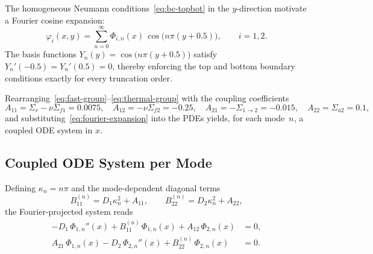 The homogeneous Neumann conditions~\eqref{eq:bc-topbot} in the $y$-direction motivate a Fourier cosine expansion:
\begin{equation}
  \varphi_i(x,y) = \sum_{n=0}^{\infty} \Phi_{i,n}(x)\,
  \cos\!\bigl(n\pi(y+0.5)\bigr),
  \qquad i=1,2.
  \label{eq:fourier-expansion}
\end{equation}
The basis functions $Y_n(y) = \cos\bigl(n\pi(y{+}0.5)\bigr)$ satisfy $Y_n'(-0.5) = Y_n'(0.5) = 0$, thereby enforcing the top and bottom boundary conditions exactly for every truncation order.

Rearranging~\eqref{eq:fast-group}--\eqref{eq:thermal-group} with the coupling coefficients
\begin{equation}
  A_{11} = \Sigma_r - \nu\Sigma_{f1} = 0.0075,\quad
  A_{12} = -\nu\Sigma_{f2} = -0.25,\quad
  A_{21} = -\Sigma_{1\to 2} = -0.015,\quad
  A_{22} = \Sigma_{a2} = 0.1,
  \label{eq:coupling-coeffs}
\end{equation}
and substituting~\eqref{eq:fourier-expansion} into the PDEs yields, for each mode~$n$, a coupled ODE system in $x$.

\subsection{Coupled ODE System per Mode}
\label{sec:coupled-ode}

Defining $\kappa_n = n\pi$ and the mode-dependent diagonal terms
\begin{equation}
  B_{11}^{(n)} = D_1\kappa_n^2 + A_{11},\qquad
  B_{22}^{(n)} = D_2\kappa_n^2 + A_{22},
  \label{eq:B-coeffs}
\end{equation}
the Fourier-projected system reads
\begin{align}
  -D_1\,\Phi_{1,n}''(x) + B_{11}^{(n)}\,\Phi_{1,n}(x) + A_{12}\,\Phi_{2,n}(x) &= 0,
  \label{eq:ode-fast} \\
  A_{21}\,\Phi_{1,n}(x) - D_2\,\Phi_{2,n}''(x) + B_{22}^{(n)}\,\Phi_{2,n}(x) &= 0.
  \label{eq:ode-thermal}
\end{align}


